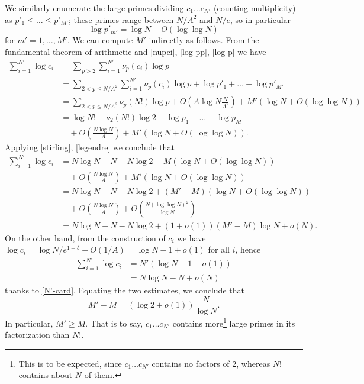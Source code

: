 \documentclass[12pt,a4paper,reqno]{amsart}
\numberwithin{equation}{section}
\theoremstyle{plain}
\theoremstyle{definition}
\begin{document}
We similarly enumerate the large primes dividing $c_1 \dots c_{N'}$ (counting multiplicity) as $p'_1 \leq \dots \leq p'_{M'}$; these primes range between $N/A^2$ and $N/e$, so in particular
\begin{equation}\label{log-pp}
  \log p'_{m'} = \log N + O(\log \log N)
\end{equation}
for $m'=1,\dots,M'$.  We can compute $M'$ indirectly as follows.  From the fundamental theorem of arithmetic and \eqref{nupci}, \eqref{log-pp}, \eqref{log-p} we have
\begin{align*}
\sum_{i=1}^{N'} \log c_i &= \sum_{p>2} \sum_{i=1}^{N'} \nu_p(c_i) \log p \\
&= \sum_{2 < p \leq N/A^2}  \sum_{i=1}^{N'} \nu_p(c_i) \log p + \log p'_1 + \dots + \log p'_{M'} \\
&= \sum_{2 < p \leq N/A^2}  \nu_p(N!) \log p + O\left( A \log N \frac{N}{A^2} \right) + M' (\log N + O(\log \log N)) \\
&= \log N! - \nu_2(N!) \log 2 - \log p_1 - \dots - \log p_M \\
&\quad + O\left( \frac{N\log N }{A} \right) + M' (\log N + O(\log\log N)).
\end{align*}
Applying \eqref{stirling}, \eqref{legendre} we conclude that
\begin{align*}
  \sum_{i=1}^{N'} \log c_i &= N \log N - N - N \log 2 - M (\log N + O(\log\log N)) \\
&\quad  + O\left( \frac{N\log N }{A} \right) + M' (\log N + O(\log\log N)) \\
&= N \log N - N - N \log 2 + (M'-M) (\log N + O(\log\log N)) \\
&\quad + O\left( \frac{N\log N }{A} \right) + O\left( \frac{N(\log\log N)^2}{\log N} \right) \\
&= N \log N - N - N \log 2 + (1+o(1)) (M'-M) \log N  + o(N).
\end{align*}
On the other hand, from the construction of $c_i$ we have $\log c_i = \log N/e^{1+\delta} + O(1/A) = \log N - 1 + o(1)$ for all $i$, hence
\begin{align*}
  \sum_{i=1}^{N'} \log c_i &= N' (\log N - 1 - o(1)) \\
  &= N \log N - N + o(N)
\end{align*}
thanks to \eqref{N'-card}. Equating the two estimates, we conclude that
\begin{equation}\label{Mdiff}
  M'-M = (\log 2 + o(1)) \frac{N}{\log N}.
\end{equation}
In particular, $M' \geq M$.  That is to say, $c_1 \dots c_{N'}$ contains more\footnote{This is to be expected, since $c_1 \dots c_{N'}$ contains no factors of $2$, whereas $N!$ contains about $N$ of them.} large primes in its factorization than $N!$.
\end{document}

